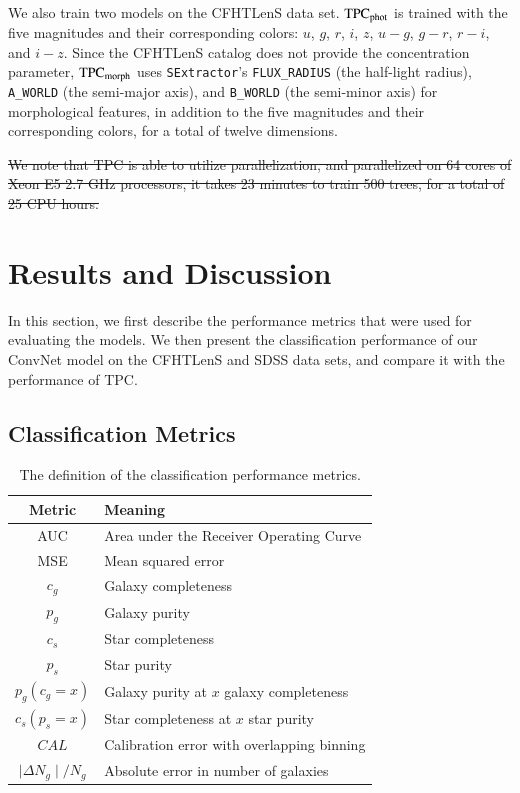 \documentclass[fleqn,usenatbib]{mnras}
\begin{document}
We also train two models on the CFHTLenS data set.
${\mathrm{TPC}}_{{\mathrm{phot}}}$ is trained with 
the five magnitudes and their corresponding colors:
$u$, $g$, $r$, $i$, $z$, $u-g$, $g-r$, $r-i$, and $i-z$.
Since the CFHTLenS catalog does not provide the concentration parameter,
${\mathrm{TPC}}_{{\mathrm{morph}}}$ uses
\texttt{SExtractor}'s \texttt{FLUX\_RADIUS} (the half-light radius),
\texttt{A\_WORLD} (the semi-major axis), and \texttt{B\_WORLD}
(the semi-minor axis) for morphological features, in addition to
the five magnitudes and their corresponding colors,
for a total of twelve dimensions.

\sout{ We note that TPC is able to utilize parallelization, and parallelized on 64 cores of Xeon E5 2.7 GHz processors, it takes 23 minutes to train 500 trees, for a total of 25 CPU hours.  }

\section{Results and Discussion}
  \label{sec:results_and_discussion}

In this section, we first describe the performance metrics that were used for
evaluating the models.
We then present the classification performance of our ConvNet model
on the CFHTLenS and SDSS data sets, and compare it with the performance of TPC.

\subsection{Classification Metrics}

\begin{table}
  \caption{The definition of the classification performance metrics.}
  \centering
  \begin{tabular}{c l}
  \hline
  Metric & Meaning \\
  \hline
  AUC & Area under the Receiver Operating Curve \\
  MSE & Mean squared error \\
  $c_g$ & Galaxy completeness \\
  $p_g$ & Galaxy purity \\
  $c_s$ & Star completeness \\
  $p_s$ & Star purity \\
  $p_g(c_g=x)$ & Galaxy purity at $x$ galaxy completeness \\
  $c_s(p_s=x)$ & Star completeness at $x$ star purity \\
  $CAL$ & Calibration error with overlapping binning \\
  $\mid\Delta N_g\mid / N_g$ & Absolute error in number of galaxies\\
  \hline
  \end{tabular}
  \label{table:metrics}
\end{table}
\end{document}
